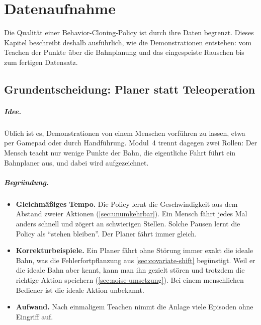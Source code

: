 \chapter{Datenaufnahme}
\label{ch:datenaufnahme}

Die Qualität einer Behavior-Cloning-Policy ist durch ihre Daten begrenzt. Dieses Kapitel
beschreibt deshalb ausführlich, wie die Demonstrationen entstehen: vom Teachen der Punkte
über die Bahnplanung und das eingespeiste Rauschen bis zum fertigen Datensatz.

\section{Grundentscheidung: Planer statt Teleoperation}
\label{sec:planer-statt-teleop}

\paragraph{Idee.} Üblich ist es, Demonstrationen von einem Menschen vorführen zu lassen, etwa
per Gamepad oder durch Handführung. Modul~4 trennt dagegen zwei Rollen: Der Mensch teacht nur
wenige Punkte der Bahn, die eigentliche Fahrt führt ein Bahnplaner aus, und dabei wird
aufgezeichnet.

\paragraph{Begründung.}
\begin{itemize}
  \item \textbf{Gleichmäßiges Tempo.} Die Policy lernt die Geschwindigkeit aus dem Abstand
    zweier Aktionen (\cref{sec:unumkehrbar}). Ein Mensch fährt jedes Mal anders schnell und
    zögert an schwierigen Stellen. Solche Pausen lernt die Policy als \enquote{stehen
    bleiben}. Der Planer fährt immer gleich.
  \item \textbf{Korrekturbeispiele.} Ein Planer fährt ohne Störung immer exakt die ideale
    Bahn, was die Fehlerfortpflanzung aus \cref{sec:covariate-shift} begünstigt. Weil er die
    ideale Bahn aber kennt, kann man ihn gezielt stören und trotzdem die richtige Aktion
    speichern (\cref{sec:noise-umsetzung}). Bei einem menschlichen Bediener ist die ideale
    Aktion unbekannt.
  \item \textbf{Aufwand.} Nach einmaligem Teachen nimmt die Anlage viele Episoden ohne
    Eingriff auf.
\end{itemize}


